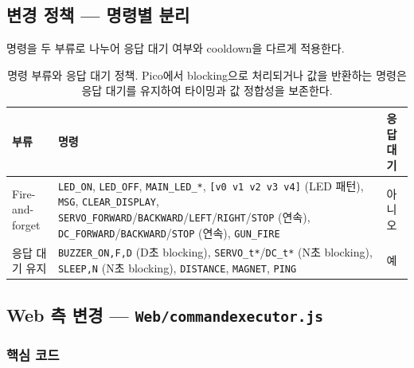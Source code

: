\documentclass[11pt, oneside]{article}
\begin{document}
\subsection{변경 정책 --- 명령별 분리}

명령을 두 부류로 나누어 응답 대기 여부와 cooldown을 다르게 적용한다.

\begin{table}[h]
\centering
\small
\begin{tabularx}{\linewidth}{@{}lXl@{}}
\toprule
부류 & 명령 & 응답 대기 \\
\midrule
Fire-and-forget & \texttt{LED\_ON}, \texttt{LED\_OFF}, \texttt{MAIN\_LED\_*}, \texttt{[v0 v1 v2 v3 v4]} (LED 패턴),
\texttt{MSG}, \texttt{CLEAR\_DISPLAY}, \texttt{SERVO\_FORWARD}/\texttt{BACKWARD}/\texttt{LEFT}/\texttt{RIGHT}/\texttt{STOP} (연속),
\texttt{DC\_FORWARD}/\texttt{BACKWARD}/\texttt{STOP} (연속), \texttt{GUN\_FIRE} & 아니오 \\
\midrule
응답 대기 유지 & \texttt{BUZZER\_ON,F,D} (D초 blocking), \texttt{SERVO\_t*}/\texttt{DC\_t*} (N초 blocking),
\texttt{SLEEP,N} (N초 blocking), \texttt{DISTANCE}, \texttt{MAGNET}, \texttt{PING} & 예 \\
\bottomrule
\end{tabularx}
\caption{명령 부류와 응답 대기 정책. Pico에서 blocking으로 처리되거나
값을 반환하는 명령은 응답 대기를 유지하여 타이밍과 값 정합성을 보존한다.}
\end{table}

\subsection{Web 측 변경 --- \texttt{Web/commandexecutor.js}}

\subsubsection*{핵심 코드}
\end{document}
